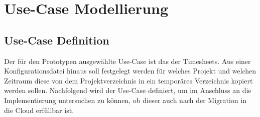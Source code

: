 \section{Use-Case Modellierung}
\label{sec:use-case-modellierung}


\subsection{Use-Case Definition}
Der für den Prototypen ausgewählte Use-Case ist das \grqq der Timesheets. Aus einer Konfigurationsdatei hinaus soll festgelegt werden für welches Projekt und welchen Zeitraum diese von dem Projektverzeichnis in ein temporäres Verzeichnis kopiert werden sollen. Nachfolgend wird der Use-Case definiert, um im Anschluss an die Implementierung untersuchen zu können, ob dieser auch nach der Migration in die Cloud erfüllbar ist. %
